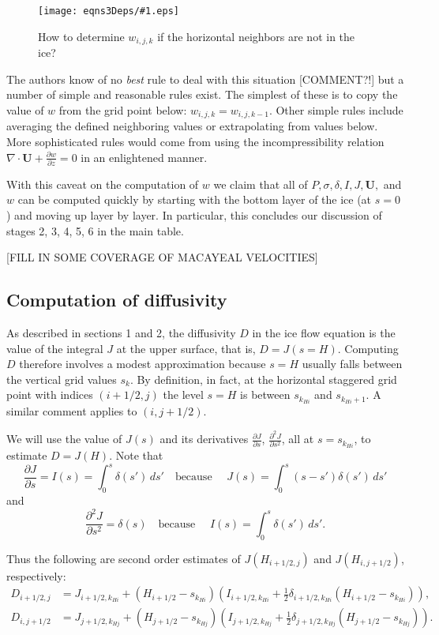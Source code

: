 \documentclass[12pt,final]{amsart}%
\theoremstyle{plain}
\theoremstyle{definition}
\theoremstyle{remark}
\newcommand{\regfigure}[2]{\texttt{[image: eqns3Deps/\#1.eps]}}
\newcommand{\ddz}[1]{\ensuremath{\frac{\partial #1}{\partial z}}}
\newcommand{\dds}[1]{\ensuremath{\frac{\partial #1}{\partial s}}}
\newcommand{\dddsds}[1]{\ensuremath{\frac{\partial^2 #1}{\partial s^2}}}
\newcommand{\diverg}{\nabla\cdot}
\newcommand{\bU}{{\mathbf{U}}}
\begin{document}
\begin{figure}[ht]
\vspace{-4mm}
\regfigure{bdrywsitfig}{2.5}
\vspace{-6mm}
\caption{How to determine $w_{i,j,k}$ if the horizontal neighbors are not in the ice?}
\label{bdrywsit}
\end{figure}

The authors know of no \emph{best} rule to deal with this situation [COMMENT?!] but a number of simple and reasonable rules exist.  The simplest of these is to copy the value of $w$ from the grid point below: $w_{i,j,k}=w_{i,j,k-1}$.  Other simple rules include averaging the defined neighboring values or extrapolating from values below.  More sophisticated rules would come from using the incompressibility relation $\diverg \bU+\ddz{w}=0$ in an enlightened manner.

With this caveat on the computation of $w$ we claim that all of $P, \sigma, \delta, I, J, \bU,$ and $w$ can be computed quickly by starting with the bottom layer of the ice (at $s=0$) and moving up layer by layer.  In particular, this concludes our discussion of stages 2, 3, 4, 5, 6 in the main table.

[FILL IN SOME COVERAGE OF MACAYEAL VELOCITIES]

\subsection*{Computation of diffusivity}  As described in sections 1 and 2, the diffusivity $D$ in the ice flow equation is the value of the integral $J$ at the upper surface, that is, $D=J(s=H)$.  Computing $D$ therefore involves a modest approximation because $s=H$ usually falls between the vertical grid values $s_k$.  By definition, in fact, at the horizontal staggered grid point with indices $(i+1/2,j)$ the level $s=H$ is between $s_{k_{Hi}}$ and $s_{k_{Hi}+1}$.  A similar comment applies to $(i,j+1/2)$.

We will use the value of $J(s)$ and its derivatives $\dds{J}$, $\dddsds{J}$, all at $s=s_{k_{Hi}}$, to estimate $D=J(H)$.  Note that
    $$\dds{J} = I(s) = \int_0^s \delta(s')\,ds' \quad \text{because } \quad J(s) = \int_0^s (s-s') \delta(s')\,ds'$$
and
    $$\dddsds{J}=\delta(s) \quad \text{because } \quad I(s) = \int_0^s \delta(s')\,ds'.$$

Thus the following are second order estimates of $J(H_{i+1/2,j})$ and $J(H_{i,j+1/2})$, respectively:
\begin{align}
D_{i+1/2,j}&=J_{i+1/2,k_{Hi}} + (H_{i+1/2}-s_{k_{Hi}}) \left(I_{i+1/2,k_{Hi}} + \frac{1}{2} \delta_{i+1/2,k_{Hi}} (H_{i+1/2}-s_{k_{Hi}})\right), \\
D_{i,j+1/2}&=J_{j+1/2,k_{Hj}} + (H_{j+1/2}-s_{k_{Hj}}) \left(I_{j+1/2,k_{Hj}} + \frac{1}{2} \delta_{j+1/2,k_{Hj}} (H_{j+1/2}-s_{k_{Hj}})\right).
\end{align}
\end{document}
